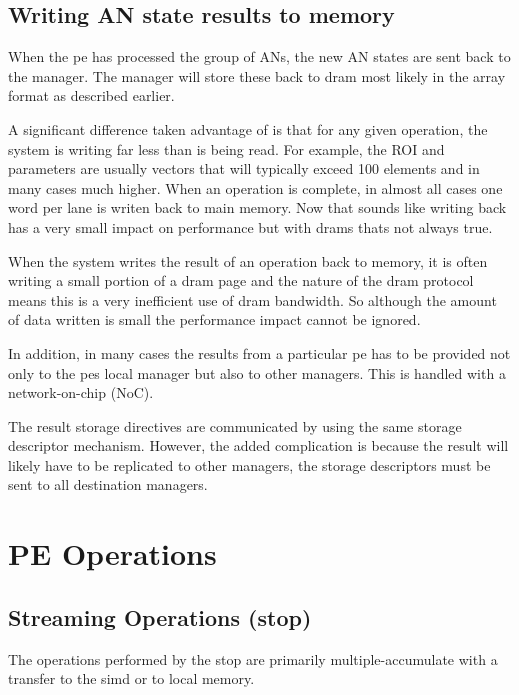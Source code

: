 \subsection{Writing AN state results to memory}
\label{sec:writingANStates}

When the \ac{pe} has processed the group of ANs, the new AN states are sent back to the manager. The manager will store these back to \ac{dram} most likely in the array format as described earlier.

A significant difference taken advantage of is that for any given operation, the system is writing far less than is being read. For example, the ROI and parameters are usually vectors that will typically exceed 100 elements and in many cases much higher. When an operation is complete, in almost all cases one word per lane is writen back to main memory. 
Now that sounds like writing back has a very small impact on performance but with \ac{dram}s thats not always true.

When the system writes the result of an operation back to memory, it is often writing a small portion of a \ac{dram} page and the nature of the \ac{dram} protocol means this is a very inefficient use of \ac{dram} bandwidth. So although the amount of data written is small the performance impact cannot be ignored.

In addition, in many cases the results from a particular \ac{pe} has to be provided not only to the \ac{pe}s local manager but also to other managers. This is handled with a network-on-chip (NoC).

The result storage directives are communicated by using the same storage descriptor mechanism. However, the added complication is because the result will likely have to be replicated to other managers, the storage descriptors must be sent to all destination managers.


\section{PE Operations}
\label{sec:PE Operations}

\subsection{Streaming Operations (\ac{stop})}
\label{sec:streamingOps}
The operations performed by the \ac{stop} are primarily multiple-accumulate with a transfer to the \ac{simd} or to local memory.

